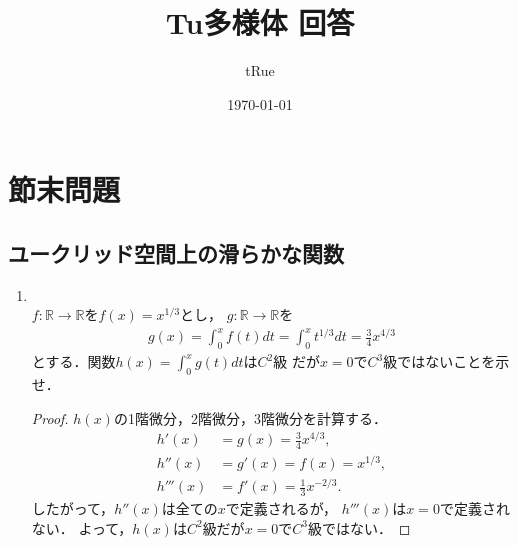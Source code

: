 \documentclass[dvipdfmx,a4paper,11pt]{jsarticle}
\begin{document}
\title{Tu多様体 回答}
\author{tRue}
\date{\today}
\maketitle

\section*{節末問題}

\subsection{ユークリッド空間上の滑らかな関数}
\begin{enumerate}
  \item {}\\
  $f\colon\mathbb{R}\to\mathbb{R}$を$f(x)=x^{1/3}$とし，
  $g\colon\mathbb{R}\to\mathbb{R}$を
  \begin{align}
    g(x)=\int_0^x f(t)dt=\int_0^xt^{1/3}dt=\frac{3}{4}x^{4/3}
  \end{align}
  とする．関数$h(x)=\int_0^xg(t)dt$は$C^2$級
  だが$x=0$で$C^3$級ではないことを示せ．
  \begin{proof}
    $h(x)$の1階微分，2階微分，3階微分を計算する．
    \begin{align}
      h'(x)&=g(x)=\frac{3}{4}x^{4/3},\\
      h''(x)&=g'(x)=f(x)=x^{1/3},\\
      h'''(x)&=f'(x)=\frac{1}{3}x^{-2/3}.
    \end{align}
    したがって，$h''(x)$は全ての$x$で定義されるが，
    $h'''(x)$は$x=0$で定義されない．
    よって，$h(x)$は$C^2$級だが$x=0$で$C^3$級ではない．
  \end{proof}
\end{enumerate}
\end{document}
